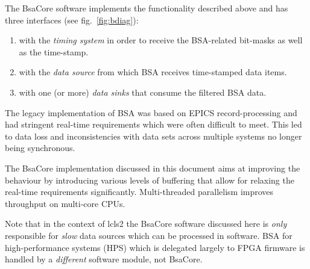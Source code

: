 \documentclass[11pt]{article}
\newcommand{\bsac}{BsaCore}
\newcommand{\bsa} {BSA}
\begin{document}
The \bsac{} software implements the functionality described above and has three
interfaces (see fig.~\ref{fig:bdiag}):
\begin{enumerate}
\item with the {\em timing system} in order to receive the \bsa-related bit-masks as well as
      the time-stamp.
\item with the {\em data source} from which \bsa{} receives time-stamped data items.
\item with one (or more) {\em data sinks} that consume the filtered \bsa{} data.
\end{enumerate}

The legacy implementation of \bsa{} was based on EPICS record-processing and had stringent
real-time requirements which were often difficult to meet. This led to data loss and 
inconsistencies with data sets across multiple systems no longer being synchronous.

The \bsac{} implementation discussed in this document aims at improving the behaviour by
introducing various levels of buffering that allow for relaxing the real-time requirements
significantly. Multi-threaded parallelism improves throughput on multi-core CPUs.

Note that in the context of lcls2 the \bsac{} software discussed here is {\em only} 
responsible for {\em slow} data sources which can be processed in software. \bsa{} for
high-performance systems (HPS) which is delegated largely to FPGA firmware is handled
by a {\em different} software module, not \bsac{}.
\end{document}
